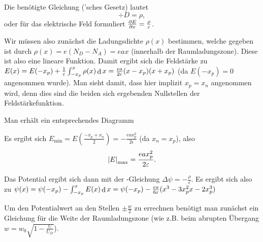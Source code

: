\documentclass{article}
\begin{document}
\begin{solution}
Die benötigte Gleichung ('sches Gesetz) lautet
$$
\div{D}=\rho,
$$
oder für das elektrische Feld formuliert $\frac{\partial{E}}{\partial{x}}=\frac{\rho}{\varepsilon}$.

Wir müssen also zunächst die Ladungsdichte $\rho(x)$ bestimmen, welche gegeben ist durch $\rho(x)=e(N_D-N_A)=eax$ (innerhalb der Raumladungszone). Diese ist also eine lineare Funktion. Damit ergibt sich die Feldstärke zu $E(x)=E(-x_p)+\frac{1}{\varepsilon}\int_{-x_p}^x{\rho(x)}\mathop\mathrm{d}{x}=\frac{ea}{2\varepsilon}(x-x_p)(x+x_p)$ (da $E(-x_p)=0$ angenommen wurde). Man sieht damit, dass hier implizit $x_p=x_n$ angenommen wird, denn dies sind die beiden sich ergebenden Nullstellen der Feldstärkefunktion.

Man erhält ein entsprechendes Diagramm
\begin{figure}[htb]
    \centering
\end{figure}

Es ergibt sich $E_{\min}=E\left(\frac{-x_p+x_n}{2}\right)=-\frac{eax_p^2}{2\epsilon}$ (da $x_n=x_p$), also
$$\left|E\right|_{\max}=\frac{eax_p^2}{2\varepsilon}.$$

Das Potential ergibt sich dann mit der -Gleichung $\Delta{\psi}=-\frac{\rho}{\epsilon}$.
Es ergibt sich also zu $\psi(x)=\psi(-x_p)-\int_{-x_p}^x{E(x)}\mathop\mathrm{d}{x}=\psi(-x_p)-\frac{ea}{6\varepsilon}(x^3-3x_p^2x-2x_p^3)$

Um den Potentialwert an den Stellen $\pm \frac{w}{2}$ zu errechnen benötigt man zunächst ein Gleichung
für die Weite der Raumladungszone (wie z.B. beim abrupten Übergang $w=w_0\sqrt{1-\frac{U}{U_D}}$).


\end{solution}
\end{document}
